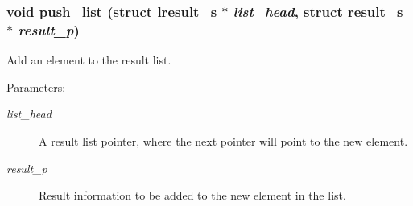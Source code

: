 \subsubsection{\setlength{\rightskip}{0pt plus 5cm}void push\_\-list (struct \bf{lresult\_\-s} $\ast$ {\em list\_\-head}, struct \bf{result\_\-s} $\ast$ {\em result\_\-p})}\label{llist_8c_f275086644ade79186d4cc3bcc25b635}


Add an element to the result list.

\begin{Desc}
\item[Parameters:]
\begin{description}
\item[{\em list\_\-head}]A result list pointer, where the next pointer will point to the new element. \item[{\em result\_\-p}]Result information to be added to the new element in the list. \end{description}
\end{Desc}
